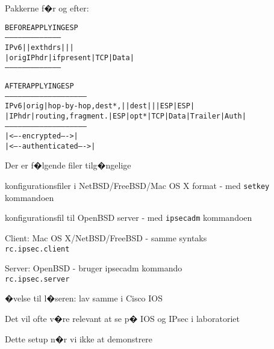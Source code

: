 
Pakkerne f�r og efter:
\begin{alltt}
\small
               BEFORE APPLYING ESP
         ---------------------------------------
   IPv6  |             | ext hdrs |     |      |
         | orig IP hdr |if present| TCP | Data |
         ---------------------------------------



               AFTER APPLYING ESP
         ---------------------------------------------------------
   IPv6  | orig |hop-by-hop,dest*,|   |dest|   |    | ESP   | ESP|
         |IP hdr|routing,fragment.|ESP|opt*|TCP|Data|Trailer|Auth|
         ---------------------------------------------------------
                                   |<---- encrypted ---->|
                               |<---- authenticated ---->|
\end{alltt}


\begin{list1}
\item Der er f�lgende filer tilg�ngelige\\
  \begin{list2}
  \item konfigurationsfiler i NetBSD/FreeBSD/Mac OS X format - med
    \verb+setkey+ kommandoen
  \item konfigurationsfil til OpenBSD server - med \verb+ipsecadm+
    kommandoen
  \end{list2}
\end{list1}




\begin{list1}
  \item Client: Mac OS X/NetBSD/FreeBSD - samme syntaks\\
\verb+rc.ipsec.client+

\item Server: OpenBSD - bruger ipsecadm kommando\\
\verb+rc.ipsec.server+

\item �velse til l�seren: lav samme i Cisco IOS
\item Det vil ofte v�re relevant at se p� IOS og IPsec i laboratoriet
\item Dette setup n�r vi ikke at demonstrere
\end{list1}

